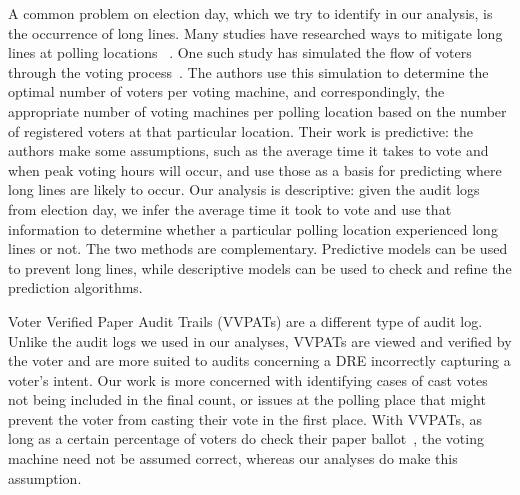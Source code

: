 A common problem on election day, which we try to identify in our analysis, is the occurrence of long lines. Many studies have researched ways to mitigate long lines at polling locations ~\cite{Allen2006,Dow2007,Spencer2010,Wilson2008}.  One such study has simulated the flow of voters through the voting process~\cite{Edel2010}. The authors use this simulation to determine the optimal number of voters per voting machine, and correspondingly, the appropriate number of voting machines per polling location based on the number of registered voters at that particular location. Their work is predictive: the authors make some assumptions, such as the average time it takes to vote and when peak voting hours will occur, and use those as a basis for predicting where long lines are likely to occur. Our analysis is descriptive: given the audit logs from election day, we infer the average time it took to vote and use that information to determine whether a particular polling location experienced long lines or not. The two methods are complementary. Predictive models can be used to prevent long lines, while descriptive models can be used to check and refine the prediction algorithms. 

Voter Verified Paper Audit Trails (VVPATs) are a different type of audit log. Unlike the audit logs we used in our analyses, VVPATs are viewed and verified by the voter and are more suited to audits concerning a DRE incorrectly capturing a voter\textquoteright s intent. Our work is more concerned with identifying cases of cast votes not being included in the final count, or issues at the polling place that might prevent the voter from casting their vote in the first place. With VVPATs, as long as a certain percentage of voters do check their paper ballot~\cite{Hall2006}, the voting machine need not be assumed correct, whereas our analyses do make this assumption.
